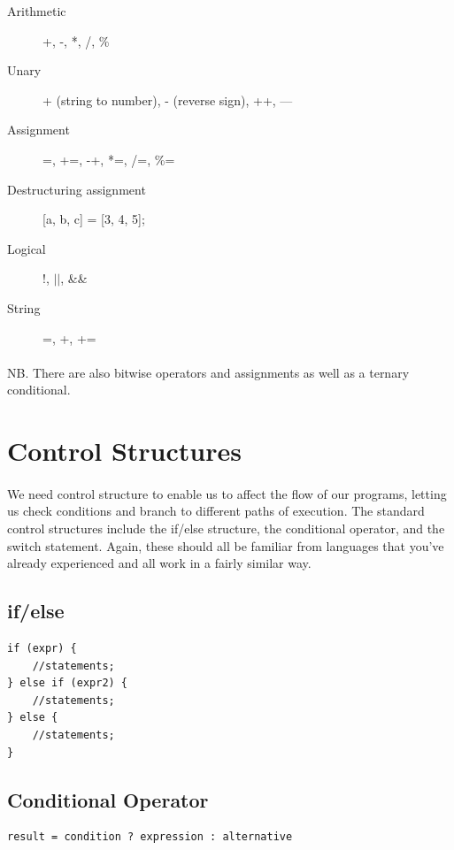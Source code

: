 \begin{description}
\item [Arithmetic] +, -, *, /, \%
\item [Unary] + (string to number), - (reverse sign), ++, —
\item [Assignment] =, +=, -+, *=, /=, \%= 
\item [Destructuring assignment] [a, b, c] = [3, 4, 5];
\item [Logical] !, $\vert\vert$, \&\&
\item [String] =, +, +=
\end{description}

\paragraph{} NB. There are also bitwise operators and assignments as well as a ternary conditional.



\section{Control Structures}
\paragraph{} We need control structure to enable us to affect the flow of our programs, letting us check conditions and branch to different paths of execution. The standard control structures include the if/else structure, the conditional operator, and the switch statement. Again, these should all be familiar from languages that you've already experienced and all work in a fairly similar way.

\subsection{if/else}

\begin{lstlisting}
if (expr) {
	//statements;
} else if (expr2) {
  	//statements;
} else {
  	//statements;
}
\end{lstlisting}

\subsection{Conditional Operator}

\begin{lstlisting}
result = condition ? expression : alternative
\end{lstlisting}

